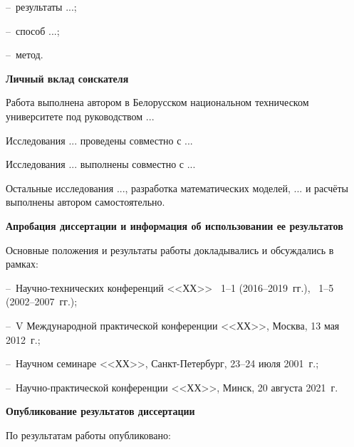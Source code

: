 --~результаты ...;


--~способ ...;

--~метод.


\textbf{Личный вклад соискателя}~

Работа выполнена автором в Белорусском национальном техническом университете под руководством ...

Исследования ... проведены совместно с ...

Исследования ... выполнены совместно с ...

Остальные исследования ..., разработка математических моделей, ... и расчёты выполнены автором самостоятельно. 


\textbf{Апробация диссертации и информация об использовании \linebreak ее результатов}~

Основные положения и результаты работы докладывались и обсуждались в рамках:

--~Научно-технических конференций <<ХХ>> \textnumero ~1--1 (2016--2019~гг.),  \textnumero ~1--5 (2002--2007~гг.);

--~V Международной практической конференции <<ХХ>>, Москва, 13 мая 2012~г.;

--~Научном семинаре <<ХХ>>, Санкт-Петербург, 23--24 июля 2001~г.;

--~Научно-практической конференции <<ХХ>>, Минск, 20 августа 2021~г.


\textbf{Опубликование результатов диссертации}

По результатам работы опубликовано:

